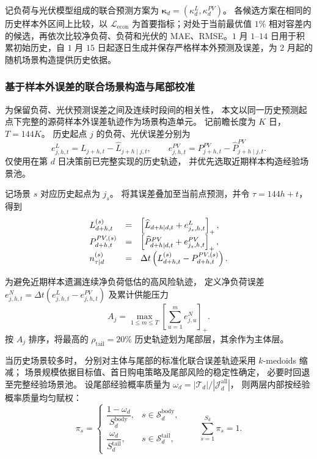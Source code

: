 \documentclass[zihao=-4,a4paper,UTF8,fontset=none]{ctexart}
\begin{document}
记负荷与光伏模型组成的联合预测方案为
$\boldsymbol{\kappa}_d=(\kappa_d^{L},\kappa_d^{PV})$。
各候选方案在相同的历史样本外区间上比较，以
$\mathcal L_{\mathrm{econ}}$ 为首要指标；对处于当前最优值 $1\%$ 相对容差内的候选，再依次比较净负荷、负荷和光伏的 MAE、RMSE。$1$ 月 $1$--$14$ 日用于积累初始历史，自 $1$ 月 $15$ 日起逐日生成并保存严格样本外预测及误差，为 $2$ 月起的随机场景构造提供历史依据。
\subsubsection{基于样本外误差的联合场景构造与尾部校准}

为保留负荷、光伏预测误差之间及连续时段间的相关性，
本文以同一历史预测起点下完整的源荷样本外误差轨迹作为场景构造单元。
记前瞻长度为 $K$ 日，$T=144K$。
历史起点 $j$ 的负荷、光伏误差分别为
\[
e_{j,h,t}^{L}
=
L_{j+h,t}-\widehat L_{j+h\mid j,t},
\qquad
e_{j,h,t}^{PV}
=
P_{j+h,t}^{PV}-\widehat P_{j+h\mid j,t}^{PV}.
\]
仅使用在第 $d$ 日决策前已完整实现的历史轨迹，
并优先选取近期样本构造经验场景池。

记场景 $s$ 对应历史起点为 $j_s$。
将其误差叠加至当前点预测，并令 $\tau=144h+t$，得到
\begin{equation}
\begin{array}{@{}lcl@{}}
L_{d+h,t}^{(s)}
&=&
\left[\widehat L_{d+h\mid d,t}+e_{j_s,h,t}^{L}\right]_+,
\\[3pt]
P_{d+h,t}^{PV,(s)}
&=&
\left[\widehat P_{d+h\mid d,t}^{PV}+e_{j_s,h,t}^{PV}\right]_+,
\\[3pt]
n_{\tau\mid d}^{(s)}
&=&
\Delta t
\left(
L_{d+h,t}^{(s)}-P_{d+h,t}^{PV,(s)}
\right).
\end{array}
\label{eq:q2_joint_scenario}
\end{equation}

为避免近期样本遗漏连续净负荷低估的高风险轨迹，
定义净负荷误差
$
e_{j,h,t}^{N}
=
\Delta t(e_{j,h,t}^{L}-e_{j,h,t}^{PV})
$
及累计供能压力
\begin{equation}
A_j
=
\max_{1\le m\le T}
\left[
\sum_{u=1}^{m}e_{j,u}^{N}
\right]_+ .
\label{eq:q2_tail_pressure}
\end{equation}
按 $A_j$ 排序，将最高的
$\rho_{\mathrm{tail}}=20\%$
历史轨迹划为尾部层，其余作为主体层。

当历史场景较多时，
分别对主体与尾部的标准化联合误差轨迹采用 $k$-medoids 缩减；
场景规模依据目标值、首日购电策略及尾部风险的稳定性确定，
必要时回退至完整经验场景池。
设尾部经验概率质量为
$
\omega_d=|\mathcal T_d|/|\mathcal J_d^{\mathrm{all}}|
$，
则两层内部按经验概率质量均匀赋权：
\begin{equation}
\pi_s
=
\begin{cases}
\dfrac{1-\omega_d}{S_d^{\mathrm{body}}},
& s\in\mathcal S_d^{\mathrm{body}},\\[6pt]
\dfrac{\omega_d}{S_d^{\mathrm{tail}}},
& s\in\mathcal S_d^{\mathrm{tail}},
\end{cases}
\qquad
\sum_{s=1}^{S_d}\pi_s=1 .
\label{eq:q2_scenario_probability}
\end{equation}
\end{document}
